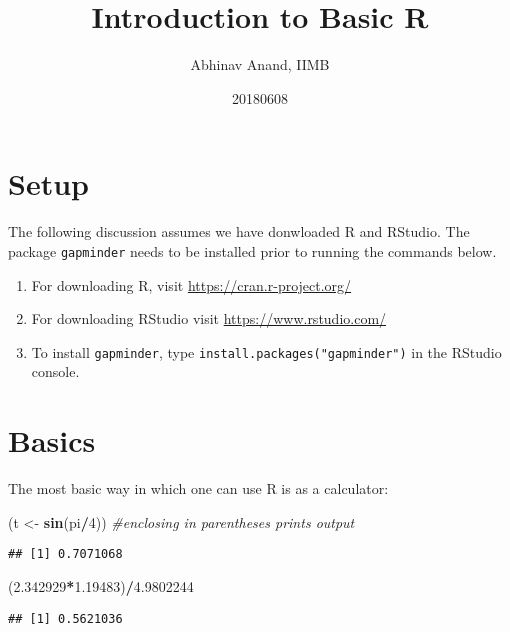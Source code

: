 \documentclass[11pt,]{article}
\title{Introduction to Basic R}
\author{Abhinav Anand, IIMB}
\date{20180608}
\newenvironment{Shaded}{\begin{snugshade}}{\end{snugshade}}
\newcommand{\KeywordTok}[1]{\textcolor[rgb]{0.13,0.29,0.53}{\textbf{#1}}}
\newcommand{\DecValTok}[1]{\textcolor[rgb]{0.00,0.00,0.81}{#1}}
\newcommand{\FloatTok}[1]{\textcolor[rgb]{0.00,0.00,0.81}{#1}}
\newcommand{\StringTok}[1]{\textcolor[rgb]{0.31,0.60,0.02}{#1}}
\newcommand{\CommentTok}[1]{\textcolor[rgb]{0.56,0.35,0.01}{\textit{#1}}}
\newcommand{\OperatorTok}[1]{\textcolor[rgb]{0.81,0.36,0.00}{\textbf{#1}}}
\newcommand{\NormalTok}[1]{#1}
\providecommand{\tightlist}{%
  \setlength{\itemsep}{0pt}\setlength{\parskip}{0pt}}
\begin{document}
\maketitle

\section{Setup}\label{setup}

The following discussion assumes we have donwloaded R and RStudio. The
package \texttt{gapminder} needs to be installed prior to running the
commands below.

\begin{enumerate}
\def\labelenumi{\arabic{enumi}.}
\tightlist
\item
  For downloading R, visit \url{https://cran.r-project.org/}
\item
  For downloading RStudio visit \url{https://www.rstudio.com/}
\item
  To install \texttt{gapminder}, type
  \texttt{install.packages("gapminder")} in the RStudio console.
\end{enumerate}

\section{Basics}\label{basics}

The most basic way in which one can use R is as a calculator:

\begin{Shaded}
\begin{Highlighting}[]
\NormalTok{(t <-}\StringTok{ }\KeywordTok{sin}\NormalTok{(pi}\OperatorTok{/}\DecValTok{4}\NormalTok{)) }\CommentTok{#enclosing in parentheses prints output}
\end{Highlighting}
\end{Shaded}

\begin{verbatim}
## [1] 0.7071068
\end{verbatim}

\begin{Shaded}
\begin{Highlighting}[]
\NormalTok{(}\FloatTok{2.342929}\OperatorTok{*}\FloatTok{1.19483}\NormalTok{)}\OperatorTok{/}\FloatTok{4.9802244}
\end{Highlighting}
\end{Shaded}

\begin{verbatim}
## [1] 0.5621036
\end{verbatim}
\end{document}
